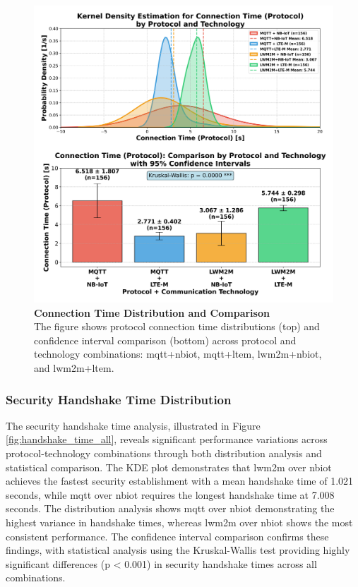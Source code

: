 \documentclass[12pt, english, openany]{book}
\begin{document}
\begin{figure}[htbp]
    \centering
    \includegraphics[width=1.0\textwidth]{connection_time_all_protocol_tech_kde_ci.png}
    \caption{\textbf{Connection Time Distribution and Comparison} \\ The figure shows protocol connection time distributions (top) and confidence interval comparison (bottom) across protocol and technology combinations: \gls{mqtt}+\gls{nbiot}, \gls{mqtt}+\gls{ltem}, \gls{lwm2m}+\gls{nbiot}, and \gls{lwm2m}+\gls{ltem}.}
    \label{fig:connection_time_all}
\end{figure}
\FloatBarrier
\subsubsection*{Security Handshake Time Distribution} \label{sec:handshake_time_analysis}

The security handshake time analysis, illustrated in Figure \ref{fig:handshake_time_all}, reveals significant performance variations across protocol-technology combinations through both distribution analysis and statistical comparison. The KDE plot demonstrates that \gls{lwm2m} over \gls{nbiot} achieves the fastest security establishment with a mean handshake time of 1.021 seconds, while \gls{mqtt} over \gls{nbiot} requires the longest handshake time at 7.008 seconds. The distribution analysis shows \gls{mqtt} over \gls{nbiot} demonstrating the highest variance in handshake times, whereas \gls{lwm2m} over \gls{nbiot} shows the most consistent performance. The confidence interval comparison confirms these findings, with statistical analysis using the Kruskal-Wallis test providing highly significant differences (p < 0.001) in security handshake times across all combinations.
\end{document}
